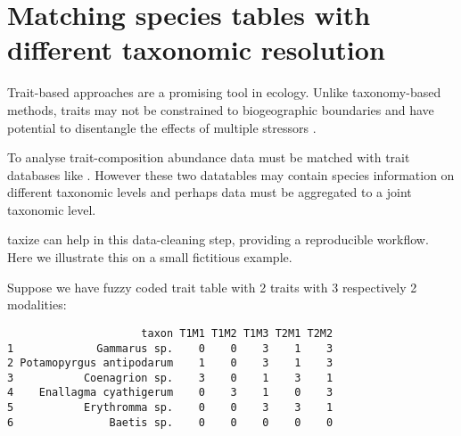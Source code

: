 \section[Matching species tables]{Matching species tables with different taxonomic resolution} 
\label{ap:taxize:two} 

Trait-based approaches are a promising tool in ecology. Unlike taxonomy-based methods, traits may not be constrained to biogeographic boundaries \citep{baird_toward_2011} and have potential to disentangle the effects of multiple stressors \citep{statzner_can_2010}. 

To analyse trait-composition abundance data must be matched with trait databases like \citep{usseglio-polatera_biological_2000}. However these two datatables may contain species information on different taxonomic levels and perhaps data must be aggregated to a joint taxonomic level.

taxize can help in this data-cleaning step, providing a reproducible workflow. Here we illustrate this on a small fictitious example.

Suppose we have fuzzy coded trait table with 2 traits with 3 respectively 2 modalities:

\begin{knitrout}
\color{fgcolor}\begin{kframe}
\begin{alltt}
 \hlkwb{<-} \hlstd{(} \hlstd{=} \hlstd{,}  \hlstd{=} \hlstd{,} \hlstd{=}\hlstd{,}
                       \hlstd{=} \hlstd{))}
\end{alltt}
\begin{verbatim}
                     taxon T1M1 T1M2 T1M3 T2M1 T2M2
1             Gammarus sp.    0    0    3    1    3
2 Potamopyrgus antipodarum    1    0    3    1    3
3           Coenagrion sp.    3    0    1    3    1
4    Enallagma cyathigerum    0    3    1    0    3
5           Erythromma sp.    0    0    3    3    1
6               Baetis sp.    0    0    0    0    0
\end{verbatim}
\end{kframe}
\end{knitrout}


